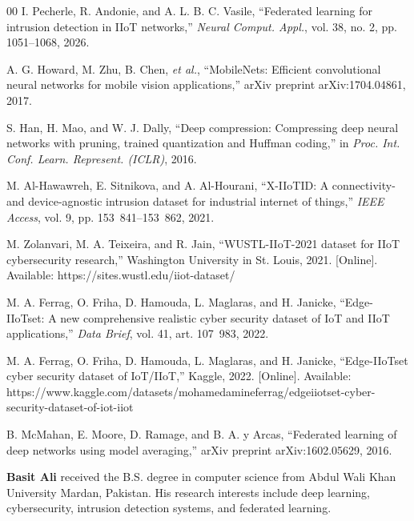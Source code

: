\documentclass[10pt,journal]{IEEEtran}
\begin{document}
\begin{thebibliography}{00}
 I. Pecherle, R. Andonie, and A. L. B. C. Vasile, ``Federated learning for intrusion detection in IIoT networks,'' \textit{Neural Comput. Appl.}, vol. 38, no. 2, pp. 1051--1068, 2026.

 A. G. Howard, M. Zhu, B. Chen, \textit{et al.}, ``MobileNets: Efficient convolutional neural networks for mobile vision applications,'' arXiv preprint arXiv:1704.04861, 2017.

 S. Han, H. Mao, and W. J. Dally, ``Deep compression: Compressing deep neural networks with pruning, trained quantization and Huffman coding,'' in \textit{Proc. Int. Conf. Learn. Represent. (ICLR)}, 2016.

 M. Al-Hawawreh, E. Sitnikova, and A. Al-Hourani, ``X-IIoTID: A connectivity- and device-agnostic intrusion dataset for industrial internet of things,'' \textit{IEEE Access}, vol. 9, pp. 153~841--153~862, 2021.

 M. Zolanvari, M. A. Teixeira, and R. Jain, ``WUSTL-IIoT-2021 dataset for IIoT cybersecurity research,'' Washington University in St. Louis, 2021. [Online]. Available: https://sites.wustl.edu/iiot-dataset/

 M. A. Ferrag, O. Friha, D. Hamouda, L. Maglaras, and H. Janicke, ``Edge-IIoTset: A new comprehensive realistic cyber security dataset of IoT and IIoT applications,'' \textit{Data Brief}, vol. 41, art. 107~983, 2022.

 M. A. Ferrag, O. Friha, D. Hamouda, L. Maglaras, and H. Janicke, ``Edge-IIoTset cyber security dataset of IoT/IIoT,'' Kaggle, 2022. [Online]. Available: https://www.kaggle.com/datasets/mohamedamineferrag/edgeiiotset-cyber-security-dataset-of-iot-iiot

 B. McMahan, E. Moore, D. Ramage, and B. A. y Arcas, ``Federated learning of deep networks using model averaging,'' arXiv preprint arXiv:1602.05629, 2016.

\end{thebibliography}

\vspace{12pt}
\textbf{Basit Ali} received the B.S. degree in computer science from Abdul Wali Khan University Mardan, Pakistan. His research interests include deep learning, cybersecurity, intrusion detection systems, and federated learning.
\end{document}
